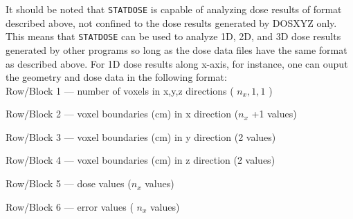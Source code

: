 \documentclass[12pt,twoside]{article}
\begin{document}
It should be noted that \verb+STATDOSE+ is capable of analyzing dose
results of format described above, not confined to the dose results
generated by DOSXYZ only. This means that \verb+STATDOSE+ can be used to
analyze 1D, 2D, and 3D dose results generated by other programs so long as
the dose data files have the same format as described above. For 1D dose
results along x-axis, for instance, one can ouput the geometry and dose
data in the following format:\\

\setlength{\parindent}{0em}
Row/Block 1 --- number of voxels in x,y,z directions ( $n_x, 1, 1$ )

Row/Block 2 --- voxel boundaries (cm) in x direction ($ n_x$ +1 values)

Row/Block 3 --- voxel boundaries (cm) in y direction (2 values)


Row/Block 4 --- voxel boundaries (cm) in z direction (2 values)

Row/Block 5 --- dose values ($ n_x$ values)

Row/Block 6 --- error values  ( $ n_x $  values)
\end{document}
